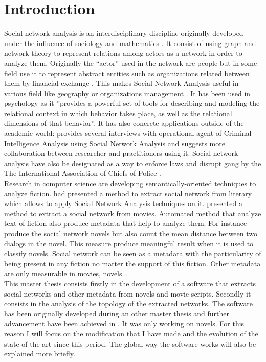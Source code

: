 \documentclass[a4paper, 12pt]{report}
\begin{document}
\chapter{Introduction}
Social network analysis is an interdisciplinary discipline originally developed under the influence of sociology and mathematics \citep{history_social}. It consist of using graph and network theory to represent relations among actors as a network in order to analyze them.  Originally the ``actor'' used in the network are people but in some field use it to represent abstract entities such as organizations related between them by financial exchange \citep{general_sna}. This makes Social Network Analysis useful in various field like geography \citep{economic_geography} or organizations  management \citep{management}.  It has been used in psychology \citep{psy} as  it ''provides a powerful set of tools for describing and modeling the relational context in which behavior takes place, as well as the relational dimensions of that behavior''\citep{intro}. It has also concrete applications outside of the academic world: \cite{criminal} provides several interviews with operational agent of  Criminal Intelligence Analysis using Social Network Analysis and suggests more collaboration between researcher and practitioners using it.  Social network analysis have also be designated as a way to enforce laws and disrupt gang by the The International Association of Chiefs of Police \citep{police}. \\

Research in computer science are developing semantically-oriented techniques to analyze fiction. \cite{character_country} had presented a method to extract social network from literary which allows to apply Social Network Analysis techniques on it. \cite{movie} presented a method to extract a social network from movies. Automated method that analyze text of fiction also produce metadata that help to analyze them. For instance \cite{original} produce the social network novels but also count the mean distance between two dialogs in the novel. This measure produce meaningful result when it is used to classify novels. Social network can be seen as a metadata with the particularity of being present in any fiction no matter the support of this fiction. Other metadata are only measurable in movies, novels... \\

This master thesis consists firstly in the development of a software that extracts social networks and other metadata from novels and movie scripts. Secondly it consists in the analysis of the topology of the extracted networks. The software has been originally developed during an other master thesis \citep{original_thesis} and further advancement have been achieved in \cite{original}. It was only working on novels. For this reason I will focus on the modification that I have made and the evolution of the state of the art since this period. The global way the software works will also be explained more briefly. \\
\end{document}
